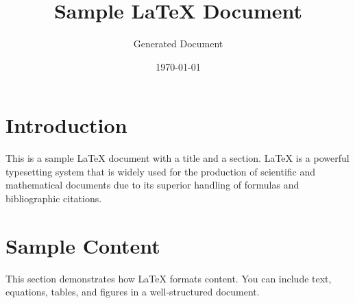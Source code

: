 \documentclass{article}
\title{Sample LaTeX Document}
\author{Generated Document}
\date{\today}
\begin{document}
\maketitle

\section{Introduction}
This is a sample LaTeX document with a title and a section. LaTeX is a powerful typesetting system that is widely used for the production of scientific and mathematical documents due to its superior handling of formulas and bibliographic citations.

\section{Sample Content}
This section demonstrates how LaTeX formats content. You can include text, equations, tables, and figures in a well-structured document.
\end{document}
